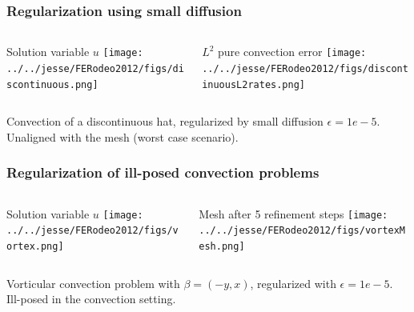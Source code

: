 \documentclass[mathserif]{beamer}
\begin{document}
\begin{frame}
\frametitle{Regularization using small diffusion}

\begin{columns}[c]
\begin{column}{5.5cm}
\begin{block}{Solution variable $u$}
\texttt{[image: ../../jesse/FERodeo2012/figs/discontinuous.png]}
\end{block}
\end{column}
\begin{column}{5.5cm}
\begin{block}{$L^2$ pure convection error}
\texttt{[image: ../../jesse/FERodeo2012/figs/discontinuousL2rates.png]}
\end{block}
\end{column}
\end{columns}
\vspace{3 mm}

Convection of a discontinuous hat, regularized by small diffusion $\epsilon = 1e-5$.  Unaligned with the mesh (worst case scenario).  

\end{frame}

\begin{frame}
\frametitle{Regularization of ill-posed convection problems}

\begin{columns}[c]
\begin{column}{5.5cm}
\begin{block}{Solution variable $u$}
\texttt{[image: ../../jesse/FERodeo2012/figs/vortex.png]}
\end{block}
\end{column}
\begin{column}{5.5cm}
\begin{block}{Mesh after 5 refinement steps}
\texttt{[image: ../../jesse/FERodeo2012/figs/vortexMesh.png]}
\end{block}
\end{column}
\end{columns}
\vspace{3 mm}

Vorticular convection problem with $\beta = (-y,x)$, regularized with $\epsilon=1e-5$.  Ill-posed in the convection setting.

\end{frame}
\end{document}
